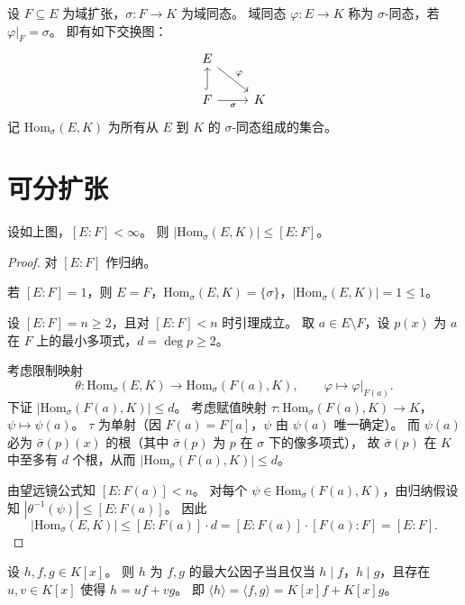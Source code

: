 \documentclass[lang=cn,a4paper,newtx]{elegantbook}
\begin{document}
\begin{definition}[$\sigma$-同态]
  设 $F\subseteq E$ 为域扩张，$\sigma\colon F\to K$ 为域同态。
  域同态 $\varphi\colon E\to K$ 称为 $\sigma$-同态，若 $\varphi\big|_F=\sigma$。
  即有如下交换图：
  \[
    \begin{tikzcd}
      E \arrow[dr,"\varphi"] \\
      F \arrow[u,hook] \arrow[r,"\sigma"'] & K
    \end{tikzcd}
  \]
  记 $\mathrm{Hom}_{\sigma}(E,K)$ 为所有从 $E$ 到 $K$ 的 $\sigma$-同态组成的集合。
\end{definition}

\section{可分扩张}

\begin{lemma}\label{hom-bound}
  设如上图，$[E:F]<\infty$。
  则 $|\mathrm{Hom}_{\sigma}(E,K)|\le[E:F]$。
\end{lemma}

\begin{proof}
  对 $[E:F]$ 作归纳。

  若 $[E:F]=1$，则 $E=F$，$\mathrm{Hom}_{\sigma}(E,K)=\{\sigma\}$，$|\mathrm{Hom}_{\sigma}(E,K)|=1\le 1$。

  设 $[E:F]=n\ge 2$，且对 $[E:F]<n$ 时引理成立。
  取 $a\in E\setminus F$，设 $p(x)$ 为 $a$ 在 $F$ 上的最小多项式，$d=\deg p\ge 2$。

  考虑限制映射
  \[
    \theta\colon\mathrm{Hom}_{\sigma}(E,K)\to\mathrm{Hom}_{\sigma}(F(a),K),\qquad \varphi\mapsto\varphi\big|_{F(a)}.
  \]
  下证 $|\mathrm{Hom}_{\sigma}(F(a),K)|\le d$。
  考虑赋值映射 $\tau\colon\mathrm{Hom}_{\sigma}(F(a),K)\to K$，$\psi\mapsto\psi(a)$。
  $\tau$ 为单射（因 $F(a)=F[a]$，$\psi$ 由 $\psi(a)$ 唯一确定）。
  而 $\psi(a)$ 必为 $\bar\sigma(p)(x)$ 的根（其中 $\bar\sigma(p)$ 为 $p$ 在 $\sigma$ 下的像多项式），
  故 $\bar\sigma(p)$ 在 $K$ 中至多有 $d$ 个根，从而 $|\mathrm{Hom}_{\sigma}(F(a),K)|\le d$。

  由望远镜公式知 $[E:F(a)]<n$。
  对每个 $\psi\in\mathrm{Hom}_{\sigma}(F(a),K)$，由归纳假设知 $|\theta^{-1}(\psi)|\le[E:F(a)]$。
  因此
  \[
    |\mathrm{Hom}_{\sigma}(E,K)|\le[E:F(a)]\cdot d=[E:F(a)]\cdot[F(a):F]=[E:F].
  \]
\end{proof}

\begin{lemma}
  设 $h,f,g\in K[x]$。
  则 $h$ 为 $f,g$ 的最大公因子当且仅当 $h\mid f$，$h\mid g$，且存在 $u,v\in K[x]$ 使得 $h=uf+vg$。
  即 $\langle h\rangle=\langle f,g\rangle=K[x]f+K[x]g$。
\end{lemma}
\end{document}
